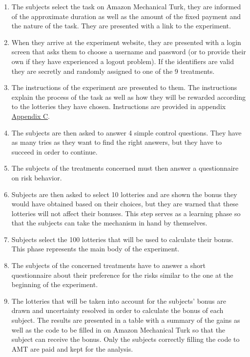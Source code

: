 \documentclass[
]{book}
\providecommand{\tightlist}{%
  \setlength{\itemsep}{0pt}\setlength{\parskip}{0pt}}
\begin{document}
\begin{enumerate}
\def\labelenumi{\arabic{enumi}.}
\tightlist
\item
  The subjects select the task on Amazon Mechanical Turk, they are
  informed of the approximate duration as well as the amount of the
  fixed payment and the nature of the task. They are presented with a
  link to the experiment.
\item
  When they arrive at the experiment website, they are presented with a login
  screen that asks them to choose a username and password (or to
  provide their own if they have experienced a logout problem). If the
  identifiers are valid they are secretly and randomly assigned to one of the 9
  treatments.
\item
  The instructions of the experiment are presented to them. The instructions
  explain the process of the task as well as how they will be rewarded
  according to the lotteries they have chosen.
  Instructions are provided in appendix \protect\hyperlink{expe-instruc4}{Appendix C}.
\item
  The subjects are then asked to answer 4 simple control questions.
  They have as many tries as they want to find the right answers, but
  they have to succeed in order to continue.
\item
  The subjects of the treatments concerned must then answer a
  questionnaire on risk behavior.
\item
  Subjects are then asked to select 10 lotteries and are shown the
  bonus they would have obtained based on their choices, but they are
  warned that these lotteries will not affect their bonuses. This step
  serves as a learning phase so that the subjects can take the
  mechanism in hand by themselves.
\item
  Subjects select the 100 lotteries that will be used to calculate
  their bonus. This phase represents the main body of the experiment.
\item
  The subjects of the concerned treatments have to answer a short
  questionnaire about their preference for the risks similar to the
  one at the beginning of the experiment.
\item
  The lotteries that will be taken into account for the subjects'
  bonus are drawn and uncertainty resolved in order to calculate the bonus of each subject.
  The results are presented in a table with a summary of the gains as
  well as the code to be filled in on Amazon Mechanical Turk so that
  the subject can receive the bonus. Only the subjects correctly filling the code to AMT are paid and kept for the analysis.
\end{enumerate}
\end{document}
